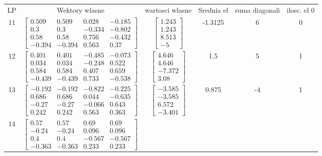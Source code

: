 \documentclass[a4paper,12pt]{article}
\begin{document}
\bgroup {} \vspace{0.2in} \begin{tabular}{c c c c c c}
LP &Wektory wlasne & wartosci wlasne & Srednia el & suma diagonali & ilosc. el 0\\
11
&
$\begin{bmatrix} 0.509 & 0.509 & 0.028 & -0.185 \\ 0.3 & 0.3 & -0.334 & -0.802 \\ 0.58 & 0.58 & 0.756 & -0.432 \\ -0.394 & -0.394 & 0.563 & 0.37 \end{bmatrix}$
&
$\begin{bmatrix} 1.243 \\ 1.243 \\ 8.513 \\ -5 \end{bmatrix}$
&
-1.3125
&
6
&
0
\\
12
&
$\begin{bmatrix} 0.401 & 0.401 & -0.485 & -0.073 \\ 0.034 & 0.034 & -0.248 & 0.522 \\ 0.584 & 0.584 & 0.407 & 0.659 \\ -0.439 & -0.439 & 0.733 & -0.538 \end{bmatrix}$
&
$\begin{bmatrix} 4.646 \\ 4.646 \\ -7.372 \\ 3.08 \end{bmatrix}$
&
1.5
&
5
&
1
\\
13
&
$\begin{bmatrix} -0.192 & -0.192 & -0.822 & -0.225 \\ 0.686 & 0.686 & 0.044 & -0.635 \\ -0.27 & -0.27 & -0.066 & 0.643 \\ 0.242 & 0.242 & 0.563 & 0.363 \end{bmatrix}$
&
$\begin{bmatrix} -3.585 \\ -3.585 \\ 6.572 \\ -3.401 \end{bmatrix}$
&
0.875
&
-4
&
1
\\
14
&
$\begin{bmatrix} 0.57 & 0.57 & 0.69 & 0.69 \\ -0.24 & -0.24 & 0.096 & 0.096 \\ 0.4 & 0.4 & -0.567 & -0.567 \\ -0.363 & -0.363 & 0.233 & 0.233 \end{bmatrix}$

\end{tabular}
\end{document}
